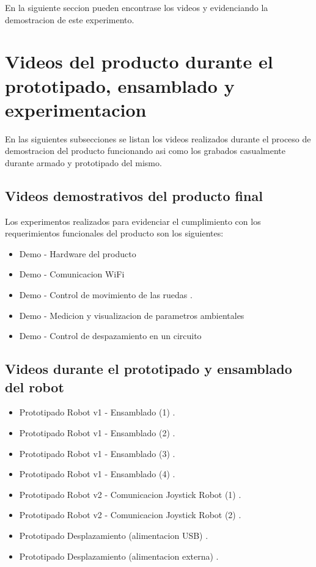 En la siguiente seccion pueden encontrase los videos \cite{Video_Demo_Control_Movimiento_1} y \cite{Video_Demo_Control_Movimiento_2} evidenciando la demostracion de este experimento.



\section{Videos del producto durante el prototipado, ensamblado y experimentacion}

En las siguientes subsecciones se listan los videos realizados durante el proceso de demostracion del producto funcionando asi como los grabados casualmente durante armado y prototipado del mismo.


\subsection{Videos demostrativos del producto final}

Los experimentos realizados para evidenciar el cumplimiento con los requerimientos funcionales del producto son los siguientes:
\begin{itemize}
	\item Demo - Hardware del producto \cite{Demo_Hardware}
	\item Demo - Comunicacion WiFi \cite{Demo_ComWifi}
	\item Demo - Control de movimiento de las ruedas \cite{Demo_Control_Movimiento_1}.
	\item Demo - Medicion y visualizacion de parametros ambientales \cite{Demo_Mediciones}
	\item Demo - Control de despazamiento en un circuito \cite{Demo_Control_Movimiento_2}
\end{itemize}


\subsection{Videos durante el prototipado y ensamblado del robot}

\begin{itemize}
	\item Prototipado Robot v1 - Ensamblado  (1) \cite{Prototipado_Ensamblado_1}.	
	\item Prototipado Robot v1 - Ensamblado  (2) \cite{Prototipado_Ensamblado_2}.
	\item Prototipado Robot v1 - Ensamblado  (3) \cite{Prototipado_Ensamblado_3}.
	\item Prototipado Robot v1 - Ensamblado  (4) \cite{Prototipado_Ensamblado_4}.
	\item Prototipado Robot v2 - Comunicacion Joystick Robot (1) \cite{Prototipado_Comunicacion_JoystickRobot1}.
	\item Prototipado Robot v2 - Comunicacion Joystick Robot (2) \cite{Prototipado_Comunicacion_JoystickRobot2}.
	\item Prototipado Desplazamiento (alimentacion USB) \cite{Prototipado_Desplazamiento_USB}.
	\item Prototipado Desplazamiento (alimentacion externa) \cite{Prototipado_Desplazamiento_USB}.

	
\end{itemize}


